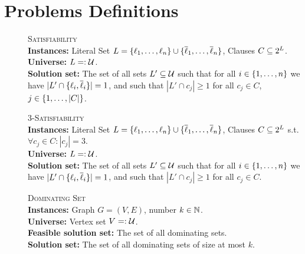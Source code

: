 \section{Problems Definitions}
\label{app:sec:problemDefinitions}

\begin{samepage}
    \begin{mdframed}
    	\begin{description}
        \item[]\textsc{Satisfiability}\hfill\\
        \textbf{Instances:} Literal Set $L = \{ \ell_1, \ldots, \ell_n \} \cup \{ \overline \ell_1, \ldots, \overline \ell_n \}$, Clauses $C \subseteq 2^{L}$.\\
        \textbf{Universe:} $L =: \mathcal{U}$.\\
        \textbf{Solution set:} The set of all sets $L' \subseteq \mathcal{U}$ such that for all $i \in \{ 1, \ldots, n \}$ we have $|L' \cap \{ \ell_i, \overline \ell_i \}| = 1$, and such that $|L' \cap c_j| \geq 1$ for all $c_j \in C$, $j \in \{ 1, \ldots, |C| \}$.
    	\end{description}
    \end{mdframed}
\end{samepage}

\begin{samepage}
    \begin{mdframed}
    	\begin{description}
        \item[]\textsc{3-Satisfiability}\hfill\\
        \textbf{Instances:} Literal Set $L = \{ \ell_1, \ldots, \ell_n \} \cup \{ \overline \ell_1, \ldots, \overline \ell_n \}$, Clauses $C \subseteq 2^{L}$ s.t. $\forall c_j \in C : |c_j| = 3$.\\
        \textbf{Universe:} $L =: \mathcal{U}$.\\
        \textbf{Solution set:} The set of all sets $L' \subseteq \mathcal{U}$ such that for all $i \in \{ 1, \ldots, n \}$ we have $|L' \cap \{ \ell_i, \overline \ell_i \}| = 1$, and such that $|L' \cap c_j| \geq 1$ for all $c_j \in C$.
    	\end{description}
    \end{mdframed}
\end{samepage}

\begin{samepage}
    \begin{mdframed}
    	\begin{description}
        \item[]\textsc{Dominating Set}\hfill\\
        \textbf{Instances:} Graph $G = (V, E)$, number $k \in \mathbb{N}$.\\
        \textbf{Universe:} Vertex set $V =: \mathcal{U}$.\\
        \textbf{Feasible solution set:} The set of all dominating sets.\\
        \textbf{Solution set:} The set of all dominating sets of size at most $k$.
    	\end{description}
    \end{mdframed}
\end{samepage}

